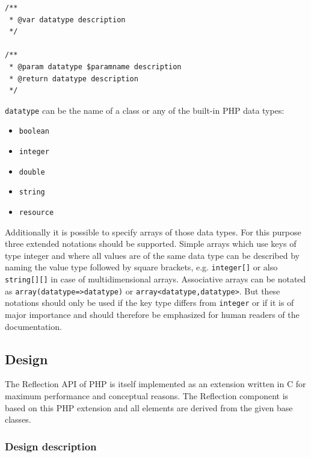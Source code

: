\documentclass[10pt,final,a4paper,oneside]{article}
\begin{document}
\begin{verbatim}
/**
 * @var datatype description
 */

/**
 * @param datatype $paramname description
 * @return datatype description
 */
\end{verbatim}

\verb|datatype| can be the name of a class
or any of the built-in PHP data types:

\begin{itemize}
	\item \verb|boolean|
	\item \verb|integer|
	\item \verb|double|
	\item \verb|string|
	\item \verb|resource|
\end{itemize}

Additionally it is possible to specify arrays of those
data types.
For this purpose three extended notations should be supported.
Simple arrays which use keys of type integer and
where all values are of the same data type
can be described by naming the value type followed by square brackets,
e.g. \verb|integer[]| or also \verb|string[][]|
in case of multidimensional arrays.
Associative arrays can be notated as
\verb|array(datatype=>datatype)| or \verb|array<datatype,datatype>|.
But these notations should only be used
if the key type differs from \verb|integer|
or if it is of major importance
and should therefore be emphasized
for human readers of the documentation. 


\subsection{Design}\label{subsec:ReflectionDesign}
%
%

The Reflection API of PHP \cite{PHP5Reflection}
is itself implemented as an extension written in C
for maximum performance and conceptual reasons.
The Reflection component is based on this PHP extension
and all elements are derived from the given base classes.

\subsubsection{Design description}
\end{document}
